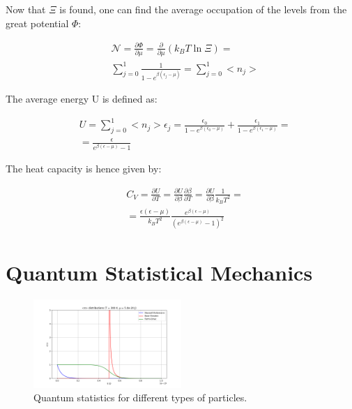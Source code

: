 \documentclass{article}
\begin{document}
Now that $\Xi$ is found, one can find the average occupation of the levels from the great potential $\Phi$:

\begin{equation}
    \begin{aligned}
         & \mathcal{N}= \frac{\partial \Phi}{\partial \mu}= \frac{\partial}{\partial \mu}\left(k_B T \ln{\Xi}\right)= \\
         & \sum_{j=0}^{1}\frac{1}{1-e^{\beta(\epsilon_j-\mu)}}= \sum_{j=0}^{1} <n_j>
    \end{aligned}
\end{equation}

The average energy U is defined as:

\begin{equation}
    \begin{aligned}
         & U=\sum_{j=0}^{1} <n_j>\epsilon_j= \frac{\epsilon_0}{1-e^{\beta(\epsilon_0-\mu)}}+\frac{\epsilon_1}{1-e^{\beta(\epsilon_1-\mu)}}= \\
         & =\frac{\epsilon}{e^{\beta(\epsilon-\mu)}-1}
    \end{aligned}
\end{equation}

The heat capacity is hence given by:

\begin{equation}
    \begin{aligned}
         & C_V=\frac{\partial U}{\partial T}= \frac{\partial U}{\partial \beta}\frac{\partial \beta}{\partial T}= \frac{\partial U}{\partial \beta}\frac{1}{k_B T^2}= \\
         & =\frac{\epsilon (\epsilon-\mu)}{k_B T^2}\frac{e^{\beta(\epsilon-\mu)}}{(e^{\beta(\epsilon-\mu)}-1)^2}
    \end{aligned}
\end{equation}

\newpage

\section{Quantum Statistical Mechanics}

\begin{figure}[h]
    \centering
    \includegraphics[width=0.5\textwidth]{images/n-distributions.png}
    \caption{Quantum statistics for different types of particles.}
    \label{fig:quantum-statistics}
\end{figure}
\end{document}
